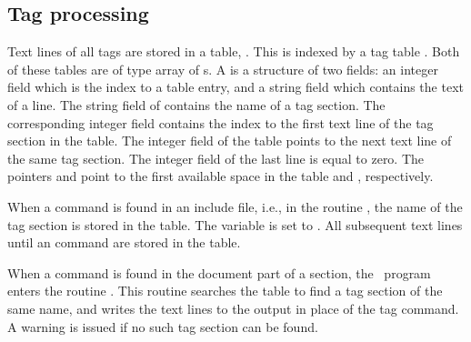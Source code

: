\subsection{Tag processing}

Text lines of all tags are stored in a table, . This
is indexed by a tag table . Both of these tables are of
type array of s. A  is a structure of two fields:
an integer field which is the index to a table entry, and a string
field which contains the text of a line. The string field of
 contains the name of a tag section. The corresponding
integer field contains the index to the first text line of the tag
section in the  table. The integer field of the
 table points to the next text line of the same tag
section. The integer field of the last line is equal to zero. The
pointers  and  point to the first
available space in the table  and ,
respectively. 

When a  command is found in an include file, 
i.e., in the routine , the name of the tag
section is stored in the  table. The variable
 is set to . All subsequent text lines until
an  command are stored in the  table.

When a  command is found in the document part of a
section, the \weave\ program enters the routine .
This routine searches the  table to find a tag section of
the same name, and writes the text lines to the output in place of the
tag command. A warning is issued if no such tag section can be
found.

